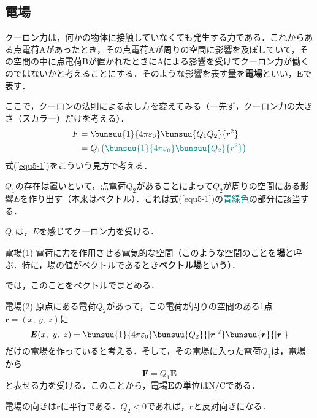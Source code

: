 \subsection{電場}

クーロン力は，何かの物体に接触していなくても発生する力である．これからある点電荷Aがあったとき，その点電荷Aが周りの空間に影響を及ぼしていて，その空間の中に点電荷Bが置かれたときにAによる影響を受けてクーロン力が働くのではないかと考えることにする．そのような影響を表す量を\textbf{電場}といい，$\bm{E}$で表す．

ここで，クーロンの法則による表し方を変えてみる（一先ず，クーロン力の大きさ（スカラー）だけを考える）．
\begin{align}
	F &= \bunsuu{1}{4\pi\varepsilon_0}\bunsuu{Q_1 Q_2}{r^2} \notag\\
	&= Q_1 {\color{teal}\left(\bunsuu{1}{4\pi\varepsilon_0}\bunsuu{Q_2}{r^2}\right)} \label{equ5-1}
\end{align}
式(\ref{equ5-1})をこういう見方で考える．
\begin{enumerate}[label=\textbf{[\arabic*]}, labelsep=10pt, leftmargin=23pt]
	\item $Q_1$の存在は置いといて，点電荷$Q_2$があることによって$Q_2$が周りの空間にある影響$E$を作り出す（本来はベクトル）．これは式(\ref{equ5-1})の\textcolor{teal}{青緑色}の部分に該当する．
	\item $Q_1$は，$E$を感じてクーロン力を受ける．
\end{enumerate}

\begin{kousiki}{電場(1)}
	電荷に力を作用させる電気的な空間（このような空間のことを\textbf{場}と呼ぶ．特に，場の値がベクトルであるとき\textbf{ベクトル場}という）．
\end{kousiki}

では，このことをベクトルでまとめる．

\begin{kousiki}{電場(2)}
	原点にある電荷$Q_2$があって，この電荷が周りの空間のある1点$\bm{r} = (x,\ y,\ z)$に
	\begin{equation}
		\bm{E}(x,\ y,\ z) = \bunsuu{1}{4\pi\varepsilon_0}\bunsuu{Q_2}{|\bm{r}|^2}\bunsuu{\bm{r}}{|\bm{r}|}
	\end{equation}
	だけの電場を作っていると考える．そして，その電場に入った電荷$Q_1$は，電場から
	\begin{equation}
		\bm{F} = Q_1 \bm{E}
	\end{equation}
	と表せる力を受ける．このことから，電場$\bm{E}$の単位は$\mathrm{N/C}$である．
\end{kousiki}

電場の向きは$\bm{r}$に平行である．$Q_2 < 0$であれば，$\bm{r}$と反対向きになる．
